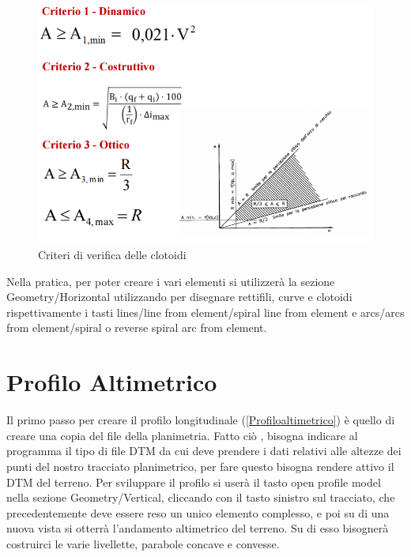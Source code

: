 \begin{figure}[H]
    \includegraphics[width=\textwidth]{Figures/criteri clotoide.png}
      \caption{Criteri di verifica delle clotoidi}
      \label{Criteri di verifica delle clotoidi}
\end{figure}

Nella pratica, per poter creare i vari elementi si utilizzerà la sezione Geometry/Horizontal utilizzando per disegnare rettifili, curve e clotoidi rispettivamente i tasti lines/line from element/spiral line from element e arcs/arcs from element/spiral o reverse spiral arc from element.

\section{Profilo Altimetrico}

Il primo passo per creare il profilo longitudinale (\ref{Profiloaltimetrico}) è quello di creare una copia del file della planimetria. Fatto ciò , bisogna indicare al programma il tipo di file DTM da cui deve prendere i dati relativi alle altezze dei punti del nostro tracciato planimetrico, per fare questo bisogna rendere attivo il DTM del terreno. Per sviluppare il profilo si userà il tasto open profile model nella sezione Geometry/Vertical, cliccando con il tasto sinistro sul tracciato, che precedentemente deve essere reso un unico elemento complesso, e poi su di una nuova vista si otterrà l'andamento altimetrico del terreno. Su di esso bisognerà costruirci le varie livellette, parabole concave e convesse.

